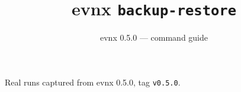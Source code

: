 \documentclass[aspectratio=169,10pt]{beamer}
\title{evnx \texttt{backup-restore}}
\subtitle{evnx 0.5.0 — command guide}
\date{}
\begin{document}
\begin{frame}[plain]\titlepage
  \begin{center}\footnotesize
  \textcolor{evnxMuted}{Real runs captured from evnx 0.5.0, tag \texttt{v0.5.0}.}
  \end{center}
\end{frame}

\end{document}
